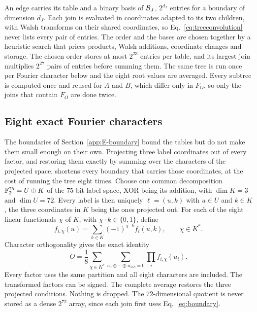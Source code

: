 An edge carries its table and a binary basis of ${\cal B}_J$, $2^{d_J}$ entries for a boundary of dimension $d_J$. Each join is evaluated in coordinates adapted to its two children, with Walsh transforms on their shared coordinates, so Eq.~\eqref{eq:treeconvolution} never lists every pair of entries. The order and the bases are chosen together by a heuristic search that prices products, Walsh additions, coordinate changes and storage. The chosen order stores at most $2^{23}$ entries per table, and its largest join multiplies $2^{27}$ pairs of entries before summing them. The same tree is run once per Fourier character below and the eight root values are averaged. Every subtree is computed once and reused for $A$ and $B$, which differ only in $F_O$, so only the joins that contain $F_O$ are done twice.

\subsection{Eight exact Fourier characters}\label{app:E-fourier}
The boundaries of Section~\ref{app:E-boundary} bound the tables but do not make them small enough on their own. Projecting three label coordinates out of every factor, and restoring them exactly by summing over the characters of the projected space, shortens every boundary that carries those coordinates, at the cost of running the tree eight times. Choose one common decomposition $\mathbb F_2^{75}=U\oplus K$ of the 75-bit label space, XOR being its addition, with $\dim K=3$ and $\dim U=72$. Every label is then uniquely $\ell=(u,k)$ with $u\in U$ and $k\in K$, the three coordinates in $K$ being the ones projected out. For each of the eight linear functionals $\chi$ of $K$, with $\chi\cdot k\in\{0,1\}$, define
\begin{equation}
 f_{i,\chi}(u)=\sum_{k\in K}(-1)^{\chi\cdot k}f_i(u,k),
 \qquad \chi\in K^*.
 \label{eq:partialfourier}
\end{equation}
Character orthogonality gives the exact identity
\begin{equation}
 O=\frac18\sum_{\chi\in K^*}
       \sum_{u_0\oplus\cdots\oplus u_{568}=0}
                       \prod_i f_{i,\chi}(u_i).
 \label{eq:eight}
\end{equation}
Every factor uses the same partition and all eight characters are included. The transformed factors can be signed. The complete average restores the three projected conditions. Nothing is dropped. The 72-dimensional quotient is never stored as a dense $2^{72}$ array, since each join first uses Eq.~\eqref{eq:boundary}.


